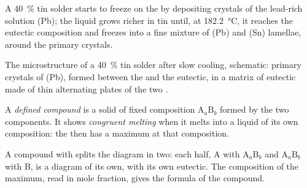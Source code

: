 A 40~\% tin solder starts to freeze on the  by depositing crystals of
the lead-rich solution (Pb); the liquid grows richer in tin until, at
\qty{182.2}{\degreeCelsius}, it reaches the eutectic composition and freezes into
a fine mixture of (Pb) and (Sn) lamellae, around the primary crystals.

\begin{omfigure}

{\small The microstructure of a 40~\% tin solder after slow cooling, schematic:
primary crystals of (Pb), formed between the  and the eutectic, in a
matrix of eutectic made of thin alternating plates of the two .}
\end{omfigure}

\begin{definition}\label{def:b2:solid-liquid-diagrams:defined-compound}
A \emph{defined compound} is a solid of fixed
composition $\mathrm{A}_a\mathrm{B}_b$ formed by the two components. It shows
\emph{congruent melting} when it melts into a liquid of
its own composition: the  then has a maximum at that composition.
\end{definition}

A compound with  splits the diagram in two: each half, A with
$\mathrm{A}_a\mathrm{B}_b$ and $\mathrm{A}_a\mathrm{B}_b$ with B, is a diagram of
its own, with its own eutectic. The composition of the maximum, read in mole
fraction, gives the formula of the compound.

